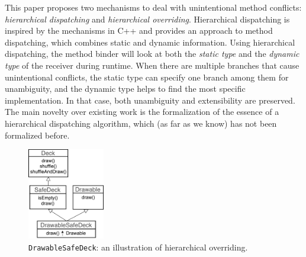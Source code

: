 


This paper proposes two mechanisms to deal with unintentional method
conflicts: \textit{hierarchical dispatching} and \emph{hierarchical
  overriding}. Hierarchical dispatching is inspired by the mechanisms in C++ and
provides an approach
to method dispatching, which combines static and dynamic
information. Using hierarchical dispatching, the method binder will look
at both the \emph{static type} and the \emph{dynamic type} of the
receiver during runtime. When there are multiple branches that cause
unintentional conflicts, the static type can specify one branch among
them for unambiguity, and the dynamic type helps to find the most
specific implementation. In that case, both unambiguity and
extensibility are preserved. The main novelty over existing work is 
the formalization of the essence of a hierarchical dispatching
algorithm, which (as far as we know) has not been formalized before. 

\begin{figure}[t]
\center  \includegraphics[height=4cm]{pics/DrawableSafeDeck3.pdf}
\caption{\lstinline|DrawableSafeDeck|: an illustration of hierarchical overriding.}
\label{fig:main}
\end{figure}

